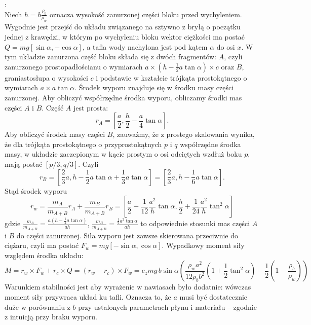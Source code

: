 \documentclass[11pt,a4paper]{article}
\begin{document}
\vspace{2mm}{\bf Rozwiązanie}:\\

Niech $h=b\frac{\rho_b}{\rho_w}$ oznacza wysokość zanurzonej części bloku przed wychyleniem. Wygodnie jest przejść do układu związanego na sztywno z bryłą o początku jednej z krawędzi, w którym po wychyleniu bloku wektor ciężkości ma postać $Q=mg[\sin \alpha,-\cos\alpha]$, a tafla wody nachylona jest pod kątem $\alpha$ do osi $x$. W tym układzie zanurzona część bloku składa się z dwóch fragmentów: $A$, czyli zanurzonego prostopadłościanu o wymiarach $a\times (h-\frac{1}{2}a\tan \alpha)\times c$ oraz $B$, graniastosłupa o wysokości $c$ i  podstawie w kształcie trójkąta prostokątnego o wymiarach $a\times a \tan \alpha$. Środek wyporu znajduje się w środku masy części zanurzonej. Aby obliczyć współrzędne środka wyporu, obliczamy środki mas części $A$ i $B$. Część $A$ jest prosta: 
\begin{equation}
r_A=[\frac{a}{2}, \frac{h}{2}-\frac{a}{4}\tan \alpha].
\end{equation}
Aby obliczyć środek masy części $B$, zauważmy, że z prostego skalowania wynika, że dla trójkąta prostokątnego o przyprostokątnych $p$ i $q$ współrzędne środka masy, w układzie zaczepionym w kącie prostym o osi odciętych wzdłuż boku $p$, mają postać $[p/3,q/3]$. Czyli 
\begin{equation}
r_B=[\frac{2}{3}a,h-\frac{1}{2}a\tan \alpha+\frac{1}{3}a \tan \alpha]=[\frac{2}{3}a,h-\frac{1}{6}a\tan\alpha].
\end{equation}
Stąd środek wyporu
\begin{equation}
r_w=\frac{m_A}{m_{A+B}}r_A+\frac{m_B}{m_{A+B}}r_B=[\frac{a}{2}+\frac{1}{12}\frac{a^2}{h}\tan \alpha, \frac{h}{2}+\frac{1}{24}\frac{a^2}{h}\tan^2\alpha]
\end{equation}
gdzie $\frac{m_A}{m_{A+B}}=\frac{a(h-\frac{1}{2}a\tan \alpha)}{ah}$, $\frac{m_B}{m_{A+B}}=\frac{\frac{1}{2}a^2\tan\alpha}{ah}$ to odpowiednie stosunki mas części $A$ i $B$ do części zanurzonej. 
Siła wyporu jest zawsze skierowana przeciwnie do ciężaru, czyli ma postać $F_w=mg[-\sin\alpha, \cos\alpha]$. Wypadkowy moment siły względem środka układu:
\begin{equation}
M=r_w\times F_w+r_c\times Q=(r_w-r_c)\times F_w=e_z mg \,b\sin\alpha \left(\frac{\rho_wa^2}{12\rho_bb^2}(1+\frac{1}{2}\tan^2\alpha)-\frac{1}{2}(1-\frac{\rho_b}{\rho_w})\right)
\end{equation}
Warunkiem stabilności jest aby wyrażenie w nawiasach było dodatnie: wówczas moment siły przywraca układ ku tafli. Oznacza to, że $a$ musi być dostatecznie duże w porównaniu z $b$ przy ustalonych parametrach płynu i materiału -- zgodnie z intuicją przy braku wyporu.  

\clearpage
\end{document}
